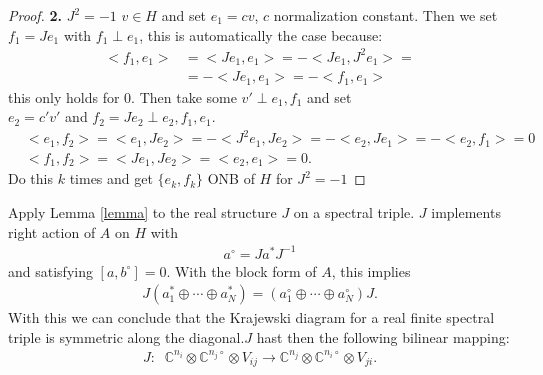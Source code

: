 \documentclass[a4paper]{article}
\theoremstyle{definition}
\theoremstyle{definition}
\theoremstyle{definition}
\theoremstyle{theorem}
\theoremstyle{theorem}
\theoremstyle{theorem}
\begin{document}
\begin{proof}
    \textbf{2.} $J^2 = -1$\newline
    $v \in H$ and set $e_1 = cv$, $c$ normalization constant.
    Then we set $f_1 = Je_1$ with $f_1 \perp e_1$, this is automatically the
    case because:
    \begin{align}
        <f_1, e_1> &= <Je_1, e_1> = -<Je_1 , J^2e_1> =\\
        &= -<Je_1, e_1> = -<f_1, e_1>
    \end{align}
    this only holds for 0. Then take some $v' \perp e_1, f_1$ and set\\
    $e_2 =c 'v'$ and $f_2 = Je_2 \perp e_2, f_1, e_1$.
    \begin{align}
        &<e_1, f_2> = <e_1, Je_2> = -<J^2e_1, Je_2> = -<e_2, Je_1> = -<e_2,
        f_1>=0\\
        &<f_1, f_2> = <Je_1, Je_2> = <e_2, e_1> = 0.
    \end{align}
    Do this $k$ times and get $\{e_k, f_k\}$ ONB of $H$ for $J^2 = -1$

\end{proof}

Apply Lemma \ref{lemma} to the real structure $J$ on a spectral triple. $J$
implements right action of $A$ on $H$ with
\begin{align}
        a^\circ = Ja^* J^{-1}
\end{align}
and satisfying $[a, b^\circ]=0$. With the block form of $A$, this implies
\begin{align}
    J(a^*_1 \oplus \cdots \oplus a_N^*) = (a^\circ_1 \oplus \cdots \oplus
    a_N^\circ)J.
\end{align}
With this we can conclude that the Krajewski diagram for a real finite spectral
triple is symmetric along the diagonal.$J$ hast then the following bilinear
mapping:
\begin{align}
    J:\;\; \mathbb{C}^{n_i} \otimes \mathbb{C}^{n_j\circ} \otimes V_{ij}
    \rightarrow \mathbb{C}^{n_j} \otimes \mathbb{C}^{n_i\circ} \otimes V_{ji}.
\end{align}
\end{document}
